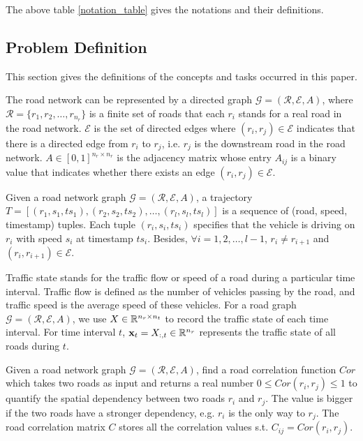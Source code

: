 The above table \ref{notation_table} gives the notations and their definitions.

\subsection{Problem Definition}
This section gives the definitions\cite{AAAI21} of the concepts and tasks occurred in this paper.
\begin{definition}
    The road network can be represented by a directed graph $\mathcal{G}=(\mathcal{R}, \mathcal{E}, A)$, where $\mathcal{R}=\{r_1, r_2, \dots, r_{n_r}\}$ is a finite set of roads that each $r_i$ stands for a real road in the road network. $\mathcal{E}$ is the set of directed edges where $(r_i, r_j)\in \mathcal{E}$ indicates that there is a directed edge from $r_i$ to $r_j$, i.e. $r_j$ is the downstream road in the road network. $A \in [0, 1]^{n_r\times n_r}$ is the adjacency matrix whose entry $A_{ij}$ is a binary value that indicates whether there exists an edge $(r_i, r_j)\in\mathcal{E}$.
\end{definition}

\begin{definition}[Trajectory]
    Given a road network graph $\mathcal{G}=(\mathcal{R}, \mathcal{E}, A)$, a trajectory $T=[(r_1, s_1, ts_1), (r_2, s_2, ts_2), \dots, (r_l, s_l, ts_l)]$ is a sequence of (road, speed, timestamp) tuples. Each tuple $(r_i, s_i, ts_i)$ specifies that the vehicle is driving on $r_i$ with speed $s_i$ at timestamp $ts_i$. Besides, $\forall i=1, 2, \dots, l-1$, $r_i\neq r_{i+1}$ and $(r_i, r_{i+1})\in\mathcal{E}$.
\end{definition}

\begin{definition}
    Traffic state stands for the traffic flow or speed of a road during a particular time interval. Traffic flow is defined as the number of vehicles passing by the road, and traffic speed is the average speed of these vehicles. For a road graph $\mathcal{G}=(\mathcal{R}, \mathcal{E}, A)$, we use $X\in\mathbb{R}^{n_r\times n_t}$ to record the traffic state of each time interval. For time interval $t$, $\mathbf{x}_t=X_{:, t}\in\mathbb{R}^{n_r}$ represents the traffic state of all roads during $t$.
\end{definition}

\begin{problem}
    Given a road network graph $\mathcal{G}=(\mathcal{R}, \mathcal{E}, A)$, find a road correlation function $Cor$ which takes two roads as input and returns a real number $0\leqslant Cor(r_i, r_j)\leqslant 1$ to quantify the spatial dependency between two roads $r_i$ and $r_j$. The value is bigger if the two roads have a stronger dependency, e.g. $r_i$ is the only way to $r_j$. The road correlation matrix $C$ stores all the correlation values s.t. $C_{ij}=Cor(r_i, r_j)$.
\end{problem}

